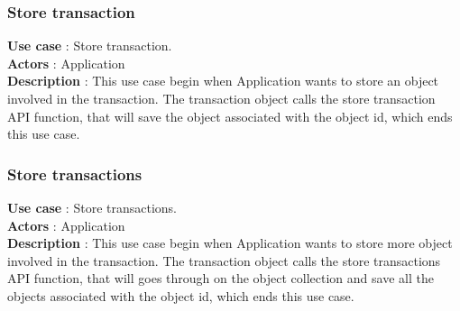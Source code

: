 \documentclass[12pt]{article}
\begin{document}
{\subsubsection{Store transaction}
\textbf{Use case} : Store transaction.\\
\textbf{Actors} : Application\\
\textbf{Description} : This use case begin when Application wants to store an object involved in the transaction. The transaction object calls the store transaction API function, that will save the object associated with the object id, which ends this use case.\\
\subsubsection{Store transactions}
\textbf{Use case} : Store transactions.\\
\textbf{Actors} : Application\\
\textbf{Description} : This use case begin when Application wants to store more object involved in the transaction. The transaction object calls the store transactions API function, that will goes through on the object  collection and save all the objects associated with the object id, which ends this use case.\\
}
\end{document}
